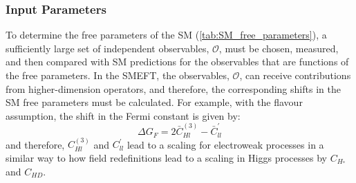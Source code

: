 \subsubsection{Input Parameters}\label{sec:input_parameter_shifts}
To determine the free parameters of the SM (\cref{tab:SM_free_parameters}), a sufficiently large set of independent observables, $\mathcal{O}$, must be chosen, measured, and then compared with SM predictions for the observables that are functions of the free parameters. In the SMEFT, the observables, $\mathcal{O}$, can receive contributions from higher-dimension operators, and therefore, the corresponding shifts in the SM free parameters must be calculated. For example, with the \topUtl flavour assumption, the shift in the Fermi constant is given by:
\begin{equation}
  \Delta G_F = 2 \bar{C}_{Hl}^{(3)} - \bar{C}_{ll}^'
\end{equation}
and therefore, $C_{Hl}^{(3)}$ and $C_{ll}^'$ lead to a scaling for electroweak processes in a similar way to how field redefinitions lead to a scaling in Higgs processes by $C_{H\square}$ and $C_{HD}$.

